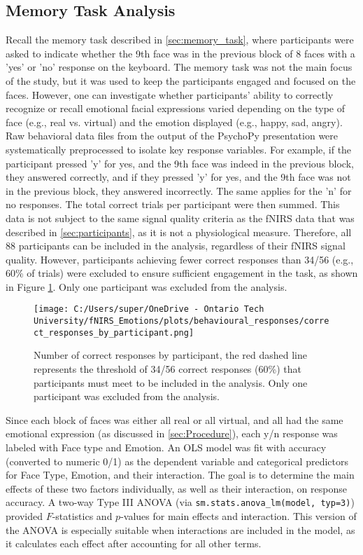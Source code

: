 \subsection{Memory Task Analysis}
Recall the memory task described in \ref{sec:memory_task}, where participants were asked to indicate whether the 9th face was in the previous block of 8 faces with a 'yes' or 'no' response on the keyboard.
The memory task was not the main focus of the study, but it was used to keep the participants engaged and focused on the faces. 
However, one can investigate whether participants' ability to correctly recognize or recall emotional facial expressions varied depending on the type of face (e.g., real vs. virtual) and the emotion displayed (e.g., happy, sad, angry). 
Raw behavioral data files from the output of the PsychoPy presentation were systematically preprocessed to isolate key response variables. 
For example, if the participant pressed 'y' for yes, and the 9th face was indeed in the previous block, they answered correctly, and if they pressed 'y' for yes, and the 9th face was not in the previous block, they answered incorrectly. 
The same applies for the 'n' for no responses. 
The total correct trials per participant were then summed. 
This data is not subject to the same signal quality criteria as the fNIRS data that was described in \ref{sec:participants}, as it is not a physiological measure. 
Therefore, all 88 participants can be included in the analysis, regardless of their fNIRS signal quality.
However, participants achieving fewer correct responses than 34/56 (e.g., 60\% of trials) were excluded to ensure sufficient engagement in the task, as shown in Figure \ref{fig:correct_responses}.
Only one participant was excluded from the analysis.

\begin{figure}[H]
    \centering
    \texttt{[image: C:/Users/super/OneDrive - Ontario Tech University/fNIRS\_Emotions/plots/behavioural\_responses/correct\_responses\_by\_participant.png]}
    \caption{Number of correct responses by participant, the red dashed line represents the threshold of 34/56 correct responses (60\%) that participants must meet to be included in the analysis.
    Only one participant was excluded from the analysis. }
    \label{fig:correct_responses}
\end{figure}

Since each block of faces was either all real or all virtual, and all had the same emotional expression (as discussed in \ref{sec:Procedure}), each y/n response was labeled with Face type and Emotion.
An OLS model was fit with accuracy (converted to numeric 0/1) as the dependent variable and categorical predictors for Face Type, Emotion, and their interaction. 
The goal is to determine the main effects of these two factors individually, as well as their interaction, on response accuracy.
A two-way Type III ANOVA (via \texttt{sm.stats.anova\_lm(model, typ=3)}) provided $F$-statistics and $p$-values for main effects and interaction.
This version of the ANOVA is especially suitable when interactions are included in the model, as it calculates each effect after accounting for all other terms.